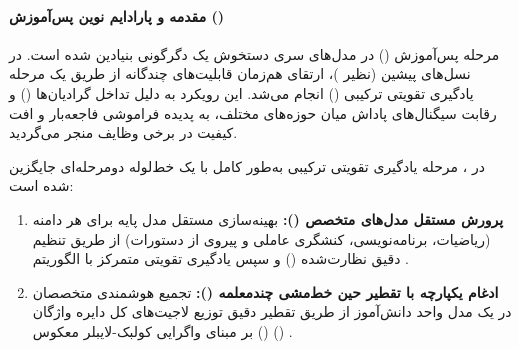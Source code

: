 \item {}

\paragraph*{مقدمه و پارادایم نوین پس‌آموزش ()}
مرحله پس‌آموزش () در مدل‌های سری  دستخوش یک دگرگونی بنیادین شده است. در نسل‌های پیشین (نظیر  \cite{deepseek2025v32})، ارتقای هم‌زمان قابلیت‌های چندگانه از طریق یک مرحله یادگیری تقویتی ترکیبی () انجام می‌شد. این رویکرد به دلیل تداخل گرادیان‌ها () و رقابت سیگنال‌های پاداش میان حوزه‌های مختلف، به پدیده فراموشی فاجعه‌بار و افت کیفیت در برخی وظایف منجر می‌گردید. 

در ، مرحله یادگیری تقویتی ترکیبی به‌طور کامل با یک خط‌لوله دومرحله‌ای جایگزین شده است:
\begin{enumerate}
    \item \textbf{پرورش مستقل مدل‌های متخصص ():} بهینه‌سازی مستقل مدل پایه برای هر دامنه (ریاضیات، برنامه‌نویسی، کنشگری عاملی و پیروی از دستورات) از طریق تنظیم دقیق نظارت‌شده () و سپس یادگیری تقویتی متمرکز با الگوریتم  \cite{deepseek2025r1}.
    \item \textbf{ادغام یکپارچه با تقطیر حین خط‌مشی چندمعلمه ():} تجمیع هوشمندی متخصصان در یک مدل واحد دانش‌آموز از طریق تقطیر دقیق توزیع لاجیت‌های کل دایره واژگان () بر مبنای واگرایی کولبک-لایبلر معکوس () \cite{lu2025onpolicy}.
\end{enumerate}

